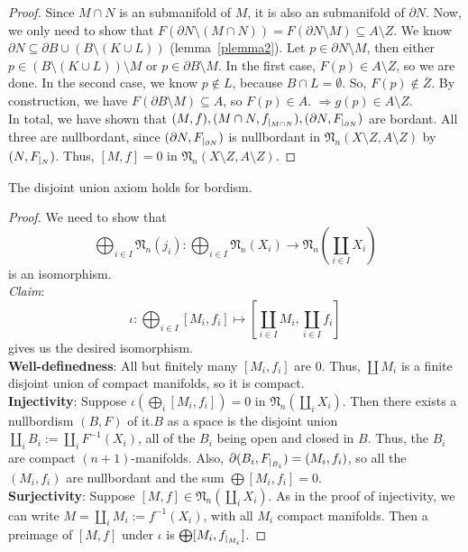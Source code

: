 \documentclass[a4paper,12pt]{article}
\begin{document}
\begin{proof}
    Since \(M\cap N\) is an submanifold of \(M\), it is also an submanifold of \(\partial N\). 
    Now, we only need to show that \(F(\partial N\setminus(M\cap N))=F(\partial N\setminus M)\subseteq A\setminus Z\). 
    We know \(\partial N\subseteq\partial B\cup(B\setminus(K\cup L))\) (lemma\ \ref{plemma2}). 
    Let \(p\in\partial N\setminus M\), then either \(p\in(B\setminus(K\cup L))\setminus M\) or \(p\in\partial B\setminus M\). In the first case, \(F(p)\in A\setminus Z\), so we are done. 
    In the second case, we know \(p\notin L\), because \(B\cap L=\emptyset\). So, \(F(p)\notin\overline{Z}\). By construction, we have \(F(\partial B\setminus M)\subseteq A\), so \(F(p)\in A\). \(\Rightarrow g(p)\in A\setminus Z\).\\
    In total, we have shown that \((M,f), (M\cap N,f_{|_{M\cap N}}), (\partial N,F_{|_{\partial N}})\) are bordant. All three are nullbordant, since \((\partial N,F_{|_{\partial N}})\) is nullbordant in \(\mathfrak{N}_n(X\setminus Z,A\setminus Z)\) by \((N,F_{|_{N}})\). Thus, \([M,f]=0\) in \(\mathfrak N_n(X\setminus Z,A\setminus Z)\).
\end{proof}


\begin{lemma}\label{disjoint union}
    The disjoint union axiom holds for bordism.
\end{lemma}

\begin{proof}\cite{zhang}
    We need to show that 
    \[\bigoplus_{i\in I}\mathfrak{N}_n(j_i):\bigoplus_{i\in I}\mathfrak{N}_n(X_i)\to\mathfrak{N}_n\left(\coprod_{i\in I}X_i\right)\] 
    is an isomorphism.\\
    \textit{Claim}: \[\iota:\bigoplus_{i\in I}[M_i,f_i]\mapsto \left[\coprod_{i\in I}M_i,\coprod_{i\in I} f_i\right]\]
    gives us the desired isomorphism.\\
    \textbf{Well-definedness}: All but finitely many \([M_i,f_i]\) are \(0\). Thus, \(\coprod M_i\) is a finite disjoint union of compact manifolds, so it is compact.\\
    \textbf{Injectivity}: Suppose \(\iota\left(\bigoplus_i[M_i,f_i]\right)=0\) in \(\mathfrak{N}_n(\coprod_i X_i)\). 
    Then there exists a nullbordism \((B,F)\) of it.\(B\) as a space is the disjoint union \(\coprod_i B_i:=\coprod_i F^{-1}(X_i)\), all of the \(B_i\) being open and closed in \(B\). 
    Thus, the \(B_i\) are compact \((n+1)\)-manifolds. Also, \(\partial(B_i,F_{|_{B_i}})=(M_i,f_i)\), so all the \((M_i,f_i)\) are nullbordant and the sum \(\bigoplus[M_i,f_i]=0\).
    \\
    \textbf{Surjectivity}: Suppose \([M,f]\in\mathfrak{N}_n(\coprod_i X_i)\). As in the proof of injectivity, we can write \(M=\coprod_i M_i:=f^{-1}(X_i)\), with all \(M_i\) compact manifolds. Then a preimage of \([M,f]\) under \(\iota\) is \(\bigoplus[M_i,f_{|_{M_i}}]\).
\end{proof}
\end{document}
